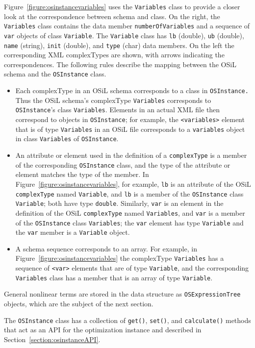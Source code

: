 \documentclass[11pt]{article}
\newcounter{Fig}
\renewcommand{\_}{{\char"5F}}
\renewcommand{\{}{{\char"7B}}
\renewcommand{\}}{{\char"7D}}
\renewcommand{\^}{{\char"0D}}
\renewcommand{\'}{{\char"0D}}
\newcommand{\Titem}{\item[$\triangleright$]}
\begin{document}
\begin{enumerate}[Step 1:]
Figure~\ref{figure:osinstancevariables} uses the {\tt Variables} class to provide a closer look at the correspondence 
between schema and class. On the right, the {\tt Variables} class contains the data member {\tt numberOfVariables} 
and a sequence of {\tt var} objects of class {\tt Variable}. The {\tt Variable} class has {\tt lb} (double), 
{\tt ub} (double), {\tt name} (string), {\tt init} (double), and {\tt type} (char) data members. On the left the 
corresponding XML complexTypes are shown, with arrows indicating the correspondences. The following rules describe 
the mapping between the OSiL schema and the {\tt OSInstance} class.
%
\begin{itemize}

\Titem  Each complexType in an OSiL schema corresponds to a class in {\tt OSInstance.}
Thus the OSiL schema's complexType {\tt Variables} corresponds to {\tt OSInstance}'s class {\tt Variables}.
Elements in an actual XML file then correspond to objects in {\tt OSInstance};
for example, the {\tt <variables>} element that is of type {\tt Variables} in an OSiL file
corresponds to a {\tt variables} object in class {\tt Variables} of {\tt OSInstance}.

\Titem An attribute or element used in the definition of a {\tt complexType} is a member of the corresponding {\tt OSInstance} class, and the type of the attribute or element matches the type of the member.  In Figure~\ref{figure:osinstancevariables}, for example, {\tt lb} is an attribute of the OSiL {\tt complexType} named {\tt Variable}, and {\tt lb} is a member of the {\tt OSInstance} class {\tt Variable}; both have type {\tt double}.  Similarly, {\tt var} is an element in the definition of the OSiL {\tt complexType} named {\tt Variables}, and {\tt var} is a member of the {\tt OSInstance} class {\tt Variables}; the {\tt var} element has type {\tt Variable} and the {\tt var} member is a {\tt Variable} object.

\Titem A schema sequence corresponds to an array. For example, in Figure~\ref{figure:osinstancevariables} the complexType {\tt Variables} has a sequence of {\tt <var>} elements that are of type {\tt Variable}, and the corresponding {\tt Variables} class has a member that is an array of type {\tt Variable}.

\end{itemize}
%
General nonlinear terms are stored in the data structure as {\tt OSExpressionTree} objects, which are the subject of the next section.

     The {\tt OSInstance} class has a collection of {\tt get()}, {\tt set()}, and {\tt calculate()} methods that act as an API for the optimization instance and described in Section~\ref{section:osinstanceAPI}.





\end{enumerate}
\end{document}
